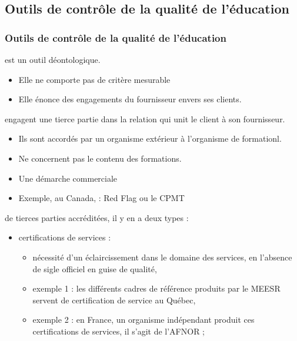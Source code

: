                   \subsection{Outils de contrôle de la qualité de l’éducation} 
					\begin{frame}[allowframebreaks]
						\frametitle{Outils de contrôle de la qualité de l’éducation}
                        			\begin{description}[Second Item]
							
							\item[Chartes] est un outil déontologique.
							\begin{itemize}
								\item Elle ne comporte pas de critère mesurable
								\item Elle énonce des engagements du fournisseur envers ses clients.
							\end{itemize}
							
							\framebreak
							
							\item[Labels] engagent une tierce partie dans la relation qui unit le client à son fournisseur. 
							\begin{itemize}
								\item Ils sont accordés par un organisme extérieur à l’organisme de formationl. 
								\item Ne concernent pas le contenu des formations. 
								\item Une démarche commerciale 
								\item Exemple, au Canada, : Red Flag ou le CPMT
							\end{itemize}
							
							\framebreak
							
							\item[Certifications] de tierces parties accréditées, il y en a deux types :
							\begin{itemize}
								\item certifications de services : 
								\begin{itemize}
									\item nécessité d’un éclaircissement dans le domaine des services, en l’absence de sigle officiel en guise de qualité,
									\item exemple 1 : les différents cadres de référence produits par le MEESR servent de certification de service au Québec, 
									\item exemple 2 :  en France, un organisme indépendant produit ces certifications de services, il s’agit de l’AFNOR ;
								\end{itemize}
								

\end{itemize}
\end{description}
\end{frame}
